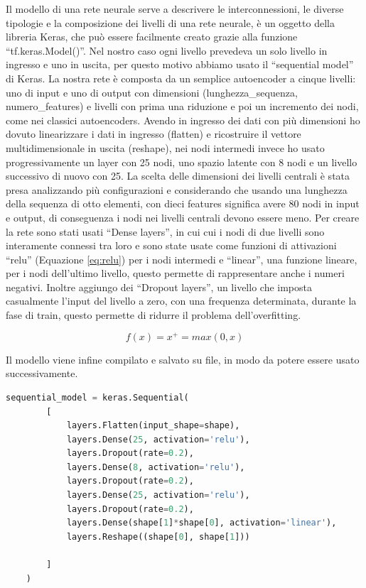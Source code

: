 Il modello di una rete neurale serve a descrivere le interconnessioni, le diverse tipologie e la composizione dei livelli di una rete neurale, è un oggetto della libreria Keras, che può essere facilmente creato grazie alla funzione ``tf.keras.Model()''.
Nel nostro caso ogni livello prevedeva un solo livello in ingresso e uno in uscita, per questo motivo abbiamo usato il ``sequential model'' di Keras.
La nostra rete è composta da un semplice autoencoder a cinque livelli: uno di input e uno di output con dimensioni (lunghezza\_sequenza, numero\_features) e livelli con prima una riduzione e poi un incremento dei nodi, come nei classici autoencoders.
Avendo in ingresso dei dati con più dimensioni ho dovuto linearizzare i dati in ingresso (flatten) e ricostruire il vettore multidimensionale in uscita (reshape), nei nodi intermedi invece ho usato progressivamente un layer con 25 nodi, uno spazio latente con 8 nodi e un livello successivo di nuovo con 25. La scelta delle dimensioni dei livelli centrali è stata presa analizzando più configurazioni e considerando che usando una lunghezza della sequenza di otto elementi, con dieci features significa avere 80 nodi in input e output, di conseguenza i nodi nei livelli centrali devono essere meno.
Per creare la rete sono stati usati ``Dense layers'', in cui cui i nodi di due livelli sono interamente connessi tra loro e sono state usate come funzioni di attivazioni ``relu'' (Equazione \ref{eq:relu}) per i nodi intermedi e ``linear'', una funzione lineare, per i nodi dell'ultimo livello, questo permette di rappresentare anche i numeri negativi.
Inoltre aggiungo dei ``Dropout layers'', un livello che imposta casualmente l'input del livello a zero, con una frequenza determinata, durante la fase di train, questo permette di ridurre il problema dell'overfitting.

\begin{equation} \label{eq:relu}
    f(x) = x^+ = max(0, x)
\end{equation}

Il modello viene infine compilato e salvato su file, in modo da potere essere usato successivamente.

\begin{lstlisting}[language=Python, label={code:get_data}, caption={Funzione usata per generale il modello della rete neurale}]
    sequential_model = keras.Sequential(
        [
            layers.Flatten(input_shape=shape),
            layers.Dense(25, activation='relu'),
            layers.Dropout(rate=0.2),
            layers.Dense(8, activation='relu'),
            layers.Dropout(rate=0.2),
            layers.Dense(25, activation='relu'),
            layers.Dropout(rate=0.2),
            layers.Dense(shape[1]*shape[0], activation='linear'),
            layers.Reshape((shape[0], shape[1]))

        ]
    )
\end{lstlisting}

